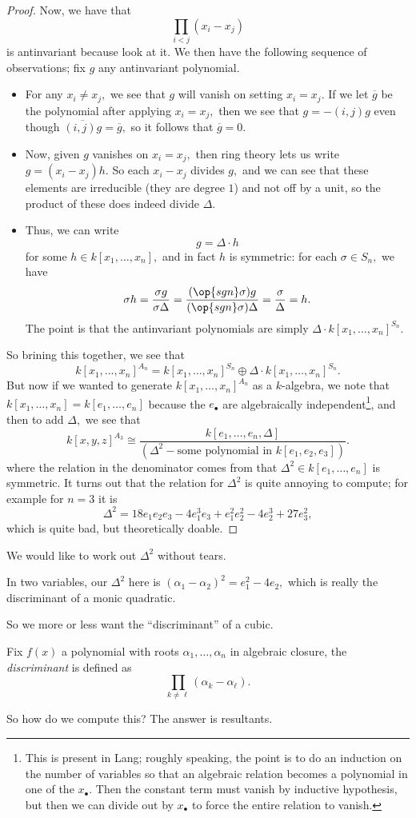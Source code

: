 \begin{proof}
	Now, we have that
	\[\prod_{i<j}(x_i-x_j)\]
	is antinvariant because look at it. We then have the following sequence of observations; fix $g$ any antinvariant polynomial.
	\begin{itemize}
		\item For any $x_i\ne x_j,$ we see that $g$ will vanish on setting $x_i=x_j.$ If we let $\overline g$ be the polynomial after applying $x_i=x_j,$ then we see that $g=-(i,j)g$ even though $\overline{(i,j)g}=\overline g,$ so it follows that $\overline g=0.$
		\item Now, given $g$ vanishes on $x_i=x_j,$ then ring theory lets us write $g=(x_i-x_j)h.$ So each $x_i-x_j$ divides $g,$ and we can see that these elements are irreducible (they are degree $1$) and not off by a unit, so the product of these does indeed divide $\Delta.$
		\item Thus, we can write
		\[g=\Delta\cdot h\]
		for some $h\in k[x_1,\ldots,x_n],$ and in fact $h$ is symmetric: for each $\sigma\in S_n,$ we have
		\[\sigma h=\frac{\sigma g}{\sigma\Delta}=\frac{(\op{sgn}\sigma)g}{(\op{sgn}\sigma)\Delta}=\frac\sigma\Delta=h.\]
		The point is that the antinvariant polynomials are simply $\Delta\cdot k[x_1,\ldots,x_n]^{S_n}.$
	\end{itemize}
	So brining this together, we see that
	\[k[x_1,\ldots,x_n]^{A_n}=k[x_1,\ldots,x_n]^{S_n}\oplus\Delta\cdot k[x_1,\ldots,x_n]^{S_n}.\]
	But now if we wanted to generate $k[x_1,\ldots,x_n]^{A_n}$ as a $k$-algebra, we note that $k[x_1,\ldots,x_n]=k[e_1,\ldots,e_n]$ because the $e_\bullet$ are algebraically independent\footnote{This is present in Lang; roughly speaking, the point is to do an induction on the number of variables so that an algebraic relation becomes a polynomial in one of the $x_\bullet.$ Then the constant term must vanish by inductive hypothesis, but then we can divide out by $x_\bullet$ to force the entire relation to vanish.}, and then to add $\Delta,$ we see that
	\[k[x,y,z]^{A_3}\cong\frac{k[e_1,\ldots,e_n,\Delta]}{\left(\Delta^2-\text{some polynomial in }k[e_1,e_2,e_3]\right)}.\]
	where the relation in the denominator comes from that $\Delta^2\in k[e_1,\ldots,e_n]$ is symmetric. It turns out that the relation for $\Delta^2$ is quite annoying to compute; for example for $n=3$ it is
	\[\Delta^2=18e_1e_2e_3-4e_1^3e_3+e_1^2e_2^2-4e_2^3+27e_3^2,\]
	which is quite bad, but theoretically doable.
\end{proof}

We would like to work out $\Delta^2$ without tears.
\begin{example}
	In two variables, our $\Delta^2$ here is $(\alpha_1-\alpha_2)^2=e_1^2-4e_2,$ which is really the discriminant of a monic quadratic.
\end{example}
So we more or less want the ``discriminant'' of a cubic.
\begin{definition}[Discriminant]
	Fix $f(x)$ a polynomial with roots $\alpha_1,\ldots,\alpha_n$ in algebraic closure, the \textit{discriminant} is defined as
	\[\prod_{k\ne\ell}(\alpha_k-\alpha_\ell).\]
\end{definition}
So how do we compute this? The answer is resultants.

